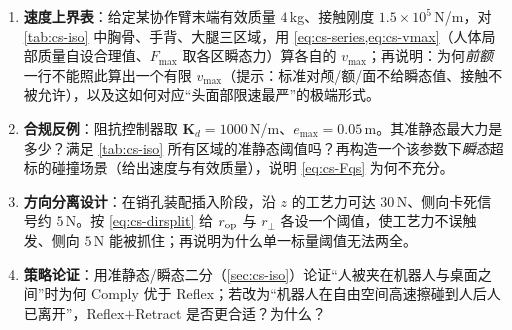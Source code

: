 \begin{practice}
\begin{enumerate}
  \item \textbf{速度上界表}：给定某协作臂末端有效质量 $4$\,kg、接触刚度 $1.5\times10^{5}$\,N/m，对 \cref{tab:cs-iso} 中胸骨、手背、大腿三区域，用 \cref{eq:cs-series,eq:cs-vmax}（人体局部质量自设合理值、$F_{\max}$ 取各区瞬态力）算各自的 $v_{\max}$；再说明：为何\emph{前额}一行不能照此算出一个有限 $v_{\max}$（提示：标准对颅/额/面不给瞬态值、接触不被允许），以及这如何对应“头面部限速最严”的极端形式。
  \item \textbf{合规反例}：阻抗控制器取 $\mathbf K_d=1000$\,N/m、$e_{\max}=0.05$\,m。其准静态最大力是多少？满足 \cref{tab:cs-iso} 所有区域的准静态阈值吗？再构造一个该参数下\emph{瞬态}超标的碰撞场景（给出速度与有效质量），说明 \cref{eq:cs-Fqs} 为何不充分。
  \item \textbf{方向分离设计}：在销孔装配插入阶段，沿 $z$ 的工艺力可达 $30$\,N、侧向卡死信号约 $5$\,N。按 \cref{eq:cs-dirsplit} 给 $r_{\rm op}$ 与 $r_\perp$ 各设一个阈值，使工艺力不误触发、侧向 $5$\,N 能被抓住；再说明为什么单一标量阈值无法两全。
  \item \textbf{策略论证}：用准静态/瞬态二分（\cref{sec:cs-iso}）论证“人被夹在机器人与桌面之间”时为何 Comply 优于 Reflex；若改为“机器人在自由空间高速擦碰到人后人已离开”，Reflex$+$Retract 是否更合适？为什么？
\end{enumerate}
\end{practice}

